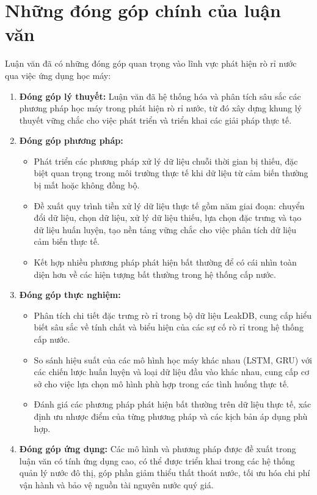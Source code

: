 \section{Những đóng góp chính của luận văn}

Luận văn đã có những đóng góp quan trọng vào lĩnh vực phát hiện rò rỉ nước qua việc ứng dụng học máy:

\begin{enumerate}
    \item \textbf{Đóng góp lý thuyết:} Luận văn đã hệ thống hóa và phân tích sâu sắc các phương pháp học máy trong phát hiện rò rỉ nước, từ đó xây dựng khung lý thuyết vững chắc cho việc phát triển và triển khai các giải pháp thực tế.
    
    \item \textbf{Đóng góp phương pháp:} 
    \begin{itemize}
        \item Phát triển các phương pháp xử lý dữ liệu chuỗi thời gian bị thiếu, đặc biệt quan trọng trong môi trường thực tế khi dữ liệu từ cảm biến thường bị mất hoặc không đồng bộ.
        \item Đề xuất quy trình tiền xử lý dữ liệu thực tế gồm năm giai đoạn: chuyển đổi dữ liệu, chọn dữ liệu, xử lý dữ liệu thiếu, lựa chọn đặc trưng và tạo dữ liệu huấn luyện, tạo nền tảng vững chắc cho việc phân tích dữ liệu cảm biến thực tế.
        \item Kết hợp nhiều phương pháp phát hiện bất thường để có cái nhìn toàn diện hơn về các hiện tượng bất thường trong hệ thống cấp nước.
    \end{itemize}
    
    \item \textbf{Đóng góp thực nghiệm:}
    \begin{itemize}
        \item Phân tích chi tiết đặc trưng rò rỉ trong bộ dữ liệu LeakDB, cung cấp hiểu biết sâu sắc về tính chất và biểu hiện của các sự cố rò rỉ trong hệ thống cấp nước.
        \item So sánh hiệu suất của các mô hình học máy khác nhau (LSTM, GRU) với các chiến lược huấn luyện và loại dữ liệu đầu vào khác nhau, cung cấp cơ sở cho việc lựa chọn mô hình phù hợp trong các tình huống thực tế.
        \item Đánh giá các phương pháp phát hiện bất thường trên dữ liệu thực tế, xác định ưu nhược điểm của từng phương pháp và các kịch bản áp dụng phù hợp.
    \end{itemize}
    
    \item \textbf{Đóng góp ứng dụng:} Các mô hình và phương pháp được đề xuất trong luận văn có tính ứng dụng cao, có thể được triển khai trong các hệ thống quản lý nước đô thị, góp phần giảm thiểu thất thoát nước, tối ưu hóa chi phí vận hành và bảo vệ nguồn tài nguyên nước quý giá.
\end{enumerate}

